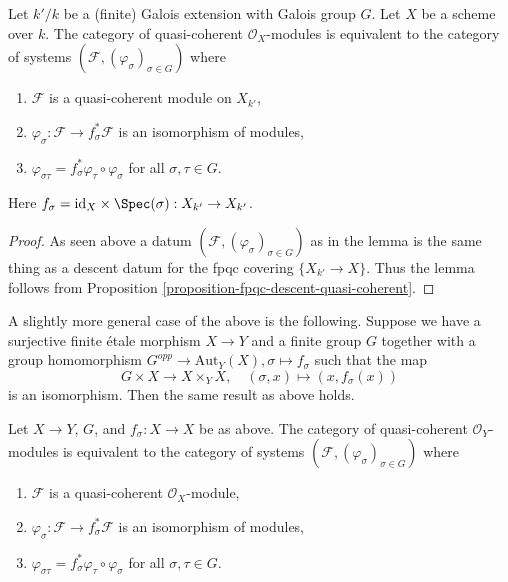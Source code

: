 \begin{lemma}
\label{lemma-galois-descent}
Let $k'/k$ be a (finite) Galois extension with Galois group $G$.
Let $X$ be a scheme over $k$. The category of quasi-coherent
$\mathcal{O}_X$-modules is equivalent to the category of systems
$(\mathcal{F}, (\varphi_\sigma)_{\sigma \in G})$ where
\begin{enumerate}
\item $\mathcal{F}$ is a quasi-coherent module on $X_{k'}$,
\item $\varphi_\sigma : \mathcal{F} \to f_\sigma^*\mathcal{F}$
is an isomorphism of modules,
\item $\varphi_{\sigma\tau} = f_\sigma^*\varphi_\tau \circ \varphi_\sigma$
for all $\sigma, \tau \in G$.
\end{enumerate}
Here $f_\sigma = \text{id}_X \times \Spec(\sigma) : X_{k'} \to X_{k'}$.
\end{lemma}

\begin{proof}
As seen above a datum $(\mathcal{F}, (\varphi_\sigma)_{\sigma \in G})$
as in the lemma is the same thing as a descent datum for the
fpqc covering $\{X_{k'} \to X\}$. Thus the lemma follows from
Proposition \ref{proposition-fpqc-descent-quasi-coherent}.
\end{proof}

\noindent
A slightly more general case of the above is the following.
Suppose we have a surjective finite \'etale morphism $X \to Y$
and a finite group $G$ together with a group homomorphism
$G^{opp} \to \text{Aut}_Y(X), \sigma \mapsto f_\sigma$
such that the map
$$
G \times X \longrightarrow X \times_Y X,\quad
(\sigma, x) \longmapsto (x, f_\sigma(x))
$$
is an isomorphism. Then the same result as above holds.

\begin{lemma}
\label{lemma-galois-descent-more-general}
Let $X \to Y$, $G$, and $f_\sigma : X \to X$ be as above.
The category of quasi-coherent
$\mathcal{O}_Y$-modules is equivalent to the category of systems
$(\mathcal{F}, (\varphi_\sigma)_{\sigma \in G})$ where
\begin{enumerate}
\item $\mathcal{F}$ is a quasi-coherent $\mathcal{O}_X$-module,
\item $\varphi_\sigma : \mathcal{F} \to f_\sigma^*\mathcal{F}$
is an isomorphism of modules,
\item $\varphi_{\sigma\tau} = f_\sigma^*\varphi_\tau \circ \varphi_\sigma$
for all $\sigma, \tau \in G$.
\end{enumerate}
\end{lemma}

